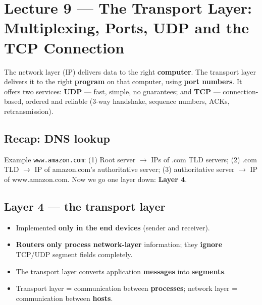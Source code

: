 \chapter{Lecture 9 --- The Transport Layer: Multiplexing, Ports, UDP and the TCP Connection}

\begin{keyidea}
The network layer (IP) delivers data to the right \textbf{computer}. The transport layer delivers it to the right \textbf{program} on that computer, using \textbf{port numbers}. It offers two services: \textbf{UDP} --- fast, simple, no guarantees; and \textbf{TCP} --- connection-based, ordered and reliable (3-way handshake, sequence numbers, ACKs, retransmission).
\end{keyidea}

\section{Recap: DNS lookup}
Example \texttt{www.amazon.com}: (1) Root server $\to$ IPs of .com TLD servers; (2) .com TLD $\to$ IP of amazon.com's authoritative server; (3) authoritative server $\to$ IP of www.amazon.com. Now we go one layer down: \textbf{Layer 4}.

\section{Layer 4 --- the transport layer}
\begin{itemize}
  \item Implemented \textbf{only in the end devices} (sender and receiver).
  \item \textbf{Routers only process network-layer} information; they \textbf{ignore} TCP/UDP segment fields completely.
  \item The transport layer converts application \textbf{messages} into \textbf{segments}.
  \item Transport layer = communication between \textbf{processes}; network layer = communication between \textbf{hosts}.
\end{itemize}

\begin{center}
\end{center}

